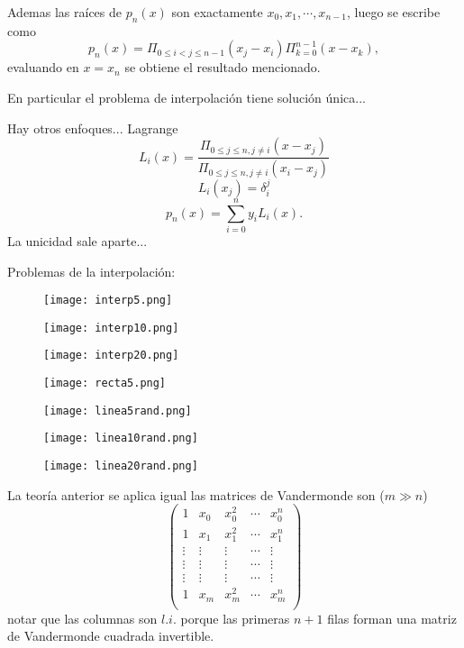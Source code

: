   Ademas las raíces de $p_n(x)$ son exactamente $x_0,x_1,\cdots, x_{n-1}$, luego se escribe como
 $$
 p_n(x)=\Pi_{0\le i<j\le n-1}(x_j-x_i)\Pi_{k=0}^{n-1}(x-x_k),
 $$
 evaluando en $x=x_n$ se obtiene el resultado mencionado.

 En particular el problema de interpolación tiene solución única...

Hay otros enfoques... Lagrange
$$
L_i(x)=\frac{\Pi_{0\le j\le n, j\neq i}(x-x_j)}{\Pi_{0\le j\le n, j\neq i}(x_i-x_j)}
$$
 $$
 L_i(x_j)=\delta_i^j
 $$
 $$
 p_n(x)=\sum_{i=0}^ny_iL_i(x).
 $$
 La unicidad sale aparte...

 Problemas de la interpolación:

 \begin{figure}
\centering\texttt{[image: interp5.png]}
\end{figure}


\begin{figure}
\centering\texttt{[image: interp10.png]}
\end{figure}

\begin{figure}
\centering\texttt{[image: interp20.png]}
\end{figure}


 \begin{figure}
\centering\texttt{[image: recta5.png]}
\end{figure}


 \begin{figure}
\centering\texttt{[image: linea5rand.png]}
\end{figure}

\begin{figure}
\centering\texttt{[image: linea10rand.png]}
\end{figure}

\begin{figure}
\centering\texttt{[image: linea20rand.png]}
\end{figure}

La teoría anterior se aplica igual las matrices de Vandermonde son ($m \gg n$)
 $$
 \begin{pmatrix}
 1&x_{0}&x_{0}^{2}&\cdots &x_{0}^{n}\\
 1&x_{1}&x_{1}^{2}&\cdots &x_{1}^{n}\\
 \vdots&\vdots&\vdots&\cdots&\vdots\\
 \vdots&\vdots&\vdots&\cdots&\vdots\\
  \vdots&\vdots&\vdots&\cdots&\vdots\\
 1&x_{m}&x_{m}^{2}&\cdots &x_{m}^{n}\\
 \end{pmatrix}
$$
notar que las columnas son $l.i.$ porque las primeras $n+1$ filas forman una matriz de Vandermonde
cuadrada invertible.

